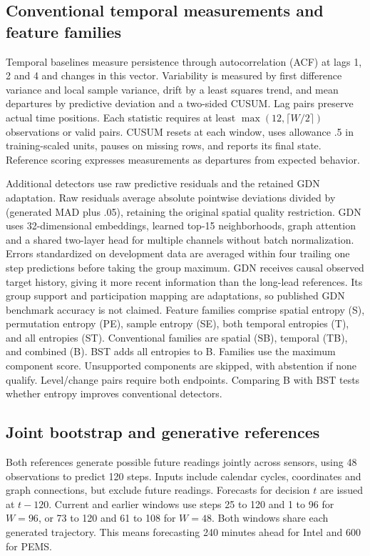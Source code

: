\documentclass[conference]{IEEEtran}
\begin{document}
\subsection{Conventional temporal measurements and feature families}
Temporal baselines measure persistence through autocorrelation (ACF) at lags
1, 2 and 4 and changes in this vector. Variability is measured by first difference
variance and local sample variance, drift by a least squares trend, and mean
departures by predictive deviation and a two-sided CUSUM. Lag pairs preserve
actual time positions. Each statistic requires at least
$\max(12,\lceil W/2\rceil)$ observations or valid pairs. CUSUM resets at each
window, uses allowance .5 in training-scaled units, pauses on missing rows,
and reports its final state. Reference scoring expresses measurements as
departures from expected behavior.

Additional detectors use raw predictive residuals and the retained GDN
adaptation. Raw residuals average absolute pointwise deviations divided by
(generated MAD plus .05), retaining the original spatial quality restriction.
GDN uses 32-dimensional embeddings, learned top-15 neighborhoods, graph
attention and a shared two-layer head for multiple channels without batch
normalization. Errors standardized on development data are averaged within
four trailing one step predictions before taking the group maximum. GDN receives
causal observed target history, giving it more recent information than the
long-lead references. Its group support and participation mapping are
adaptations, so published GDN benchmark accuracy is not claimed.
Feature families comprise spatial entropy (S), permutation entropy (PE),
sample entropy (SE), both temporal entropies (T), and all entropies (ST).
Conventional families are spatial (SB), temporal (TB), and combined (B).
BST adds all entropies to B. Families use the maximum component score.
Unsupported components are skipped, with abstention if none qualify.
Level/change pairs require both endpoints. Comparing B with BST tests
whether entropy improves conventional detectors.









\subsection{Joint bootstrap and generative references}
Both references generate possible future readings jointly across sensors,
using 48 observations to predict 120 steps. Inputs include calendar cycles,
coordinates and graph connections, but exclude future readings. Forecasts
for decision $t$ are issued at $t-120$. Current and earlier windows use
steps 25 to 120 and 1 to 96 for $W=96$, or 73 to 120 and 61 to 108 for $W=48$.
Both windows share each generated trajectory. This means forecasting
240 minutes ahead for Intel and 600 for PEMS.
\end{document}
